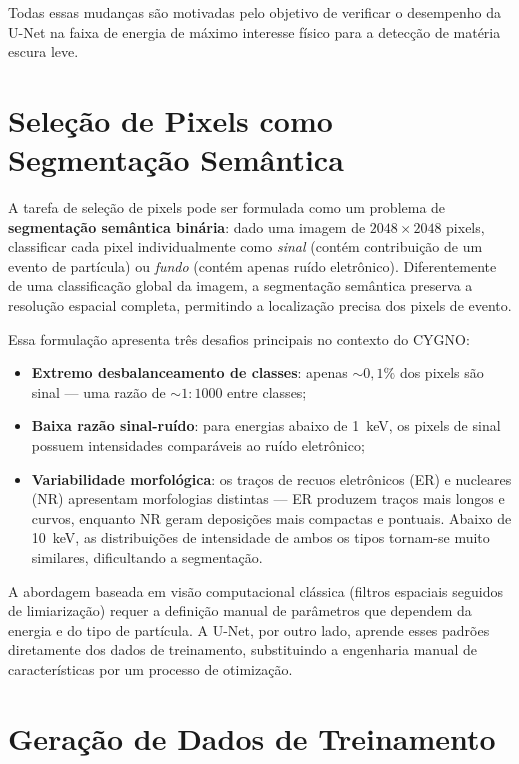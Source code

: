 \documentclass[
       oneside,
       english,
       brazil
       ]{abntbibufjf}
\begin{document}
Todas essas mudanças são motivadas pelo objetivo de verificar o desempenho da
U-Net na faixa de energia de máximo interesse físico para a detecção de
matéria escura leve.

\section{Seleção de Pixels como Segmentação Semântica}
\label{sec:semantic_seg}

A tarefa de seleção de pixels pode ser formulada como um problema de
\textbf{segmentação semântica binária}: dado uma imagem de
$2048 \times 2048$ pixels, classificar cada pixel individualmente como
\textit{sinal} (contém contribuição de um evento de partícula) ou
\textit{fundo} (contém apenas ruído eletrônico). Diferentemente de uma
classificação global da imagem, a segmentação semântica preserva a resolução
espacial completa, permitindo a localização precisa dos pixels de evento.

Essa formulação apresenta três desafios principais no contexto do CYGNO:
\begin{itemize}
    \item \textbf{Extremo desbalanceamento de classes}: apenas ${\sim}0{,}1\%$
    dos pixels são sinal — uma razão de ${\sim}1{:}1000$ entre classes;
    \item \textbf{Baixa razão sinal-ruído}: para energias abaixo de 1~keV,
    os pixels de sinal possuem intensidades comparáveis ao ruído eletrônico;
    \item \textbf{Variabilidade morfológica}: os traços de recuos eletrônicos
    (ER) e nucleares (NR) apresentam morfologias distintas — ER produzem
    traços mais longos e curvos, enquanto NR geram deposições mais compactas
    e pontuais. Abaixo de 10~keV, as distribuições de intensidade de ambos
    os tipos tornam-se muito similares, dificultando a segmentação.
\end{itemize}

A abordagem baseada em visão computacional clássica (filtros espaciais
seguidos de limiarização) requer a definição manual de parâmetros que
dependem da energia e do tipo de partícula. A U-Net, por outro lado, aprende
esses padrões diretamente dos dados de treinamento, substituindo a engenharia
manual de características por um processo de otimização.

\section{Geração de Dados de Treinamento}
\label{sec:data_generation}
\end{document}
